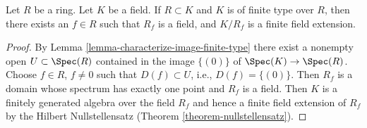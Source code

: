 \begin{lemma}
\label{lemma-field-finite-type-over-domain}
Let $R$ be a ring. Let $K$ be a field.
If $R \subset K$ and $K$ is of finite type over $R$,
then there exists an $f \in R$ such that $R_f$ is a field,
and $K/R_f$ is a finite field extension.
\end{lemma}

\begin{proof}
By Lemma \ref{lemma-characterize-image-finite-type} there
exist a nonempty open $U \subset \Spec(R)$
contained in the image $\{(0)\}$ of $\Spec(K) \to \Spec(R)$.
Choose $f \in R$, $f \not = 0$ such that $D(f) \subset U$, i.e.,
$D(f) = \{(0)\}$. Then $R_f$ is a domain whose spectrum has exactly one
point and $R_f$ is a field. Then $K$ is a finitely generated algebra
over the field $R_f$ and hence a finite field extension of
$R_f$ by the Hilbert Nullstellensatz (Theorem \ref{theorem-nullstellensatz}).
\end{proof}